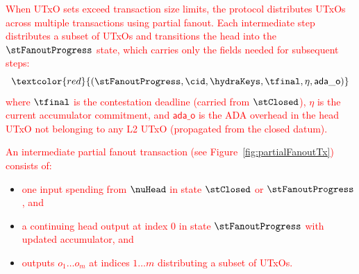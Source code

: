 \textcolor{red}{When UTxO sets exceed transaction size limits, the protocol distributes UTxOs across
multiple transactions using partial fanout. Each intermediate step distributes a subset of UTxOs and
transitions the head into the $\stFanoutProgress$ state, which carries only the fields needed for
subsequent steps:}
\[
  \textcolor{red}{(\stFanoutProgress,\cid,\hydraKeys,\tfinal,\eta,\mathsf{ada\_o})}
\]
\textcolor{red}{where $\tfinal$ is the contestation deadline (carried from $\stClosed$), $\eta$ is the
current accumulator commitment, and $\mathsf{ada\_o}$ is the ADA overhead in the head UTxO not
belonging to any L2 UTxO (propagated from the closed datum).}

\textcolor{red}{An intermediate partial fanout transaction (see Figure~\ref{fig:partialFanoutTx}) consists of:}
\begin{itemize}
  \item \textcolor{red}{one input spending from $\nuHead$ in state $\stClosed$ or $\stFanoutProgress$, and}
  \item \textcolor{red}{a continuing head output at index 0 in state $\stFanoutProgress$ with updated accumulator, and}
  \item \textcolor{red}{outputs $o_{1} \dots o_{m}$ at indices $1 \dots m$ distributing a subset of UTxOs.}
\end{itemize}

